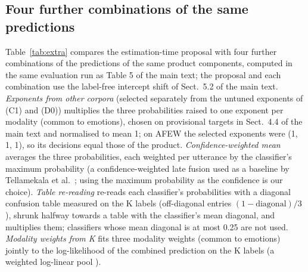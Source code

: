 \documentclass[sn-nature,pdflatex]{sn-jnl}
\begin{document}
\subsection{Four further combinations of the same predictions}
Table~\ref{tab:extra} compares the estimation-time proposal with four further combinations of the predictions of the same product components, computed in the same evaluation run as Table 5 of the main text; the proposal and each combination use the label-free intercept shift of Sect.~5.2 of the main text. \emph{Exponents from other corpora} (selected separately from the untuned exponents of (C1) and (D0)) multiplies the three probabilities raised to one exponent per modality (common to emotions), chosen on provisional targets in Sect.~4.4 of the main text and normalised to mean 1; on AFEW the selected exponents were (1, 1, 1), so its decisions equal those of the product. \emph{Confidence-weighted mean} averages the three probabilities, each weighted per utterance by the classifier's maximum probability (a confidence-weighted late fusion used as a baseline by Tellamekala et al.\ \cite{tellamekala2024}; using the maximum probability as the confidence is our choice). \emph{Table re-reading} re-reads each classifier's probabilities with a diagonal confusion table measured on the K labels (off-diagonal entries $(1-\text{diagonal})/3$), shrunk halfway towards a table with the classifier's mean diagonal, and multiplies them; classifiers whose mean diagonal is at most 0.25 are not used. \emph{Modality weights from K} fits three modality weights (common to emotions) jointly to the log-likelihood of the combined prediction on the K labels (a weighted log-linear pool \cite{heskes1997}).
\end{document}
